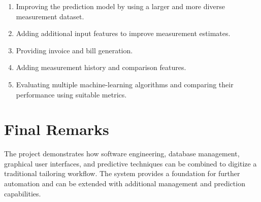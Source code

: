 \documentclass[12pt,a4paper]{report}
\begin{document}
\begin{enumerate}
  \item Improving the prediction model by using a larger and more diverse
        measurement dataset.
  \item Adding additional input features to improve measurement estimates.
  \item Providing invoice and bill generation.
  \item Adding measurement history and comparison features.
  \item Evaluating multiple machine-learning algorithms and comparing their
        performance using suitable metrics.
\end{enumerate}

\section{Final Remarks}

The project demonstrates how software engineering, database management,
graphical user interfaces, and predictive techniques can be combined to
digitize a traditional tailoring workflow. The system provides a foundation
for further automation and can be extended with additional management and
prediction capabilities.

\end{document}
